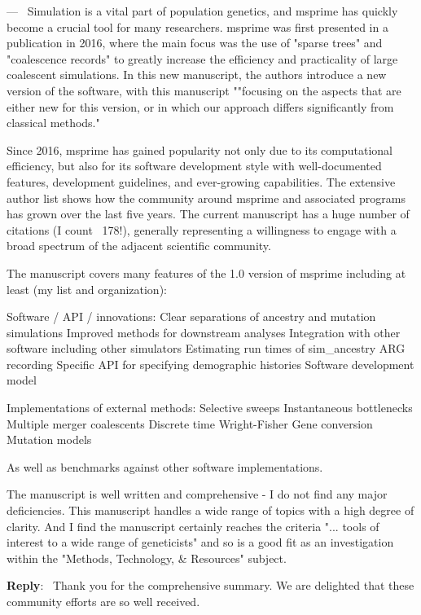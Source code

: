 \documentclass[11pt]{article}
\newcounter{reviewer}
\newcounter{point}[reviewer]
\renewcommand{\thepoint}{\thereviewer.\arabic{point}}
\newenvironment{point}
   {\refstepcounter{point} \bigskip \noindent {\textbf{Reviewer~Point~\thepoint} } ---\ }
   {\par }
\newenvironment{reply}
   {\medskip \noindent \begin{sf}\textbf{Reply}:\  }
   {\medskip \end{sf}}
\begin{document}
\begin{point}
Simulation is a vital part of population genetics, and msprime has quickly
become a crucial tool for many researchers. msprime was first presented in a
publication in 2016, where the main focus was the use of "sparse trees" and
"coalescence records" to greatly increase the efficiency and practicality of
large coalescent simulations. In this new manuscript, the authors introduce a
new version of the software, with this manuscript ""focusing on the aspects
that are either new for this version, or in which our approach differs
significantly from classical methods."

Since 2016, msprime has gained popularity not only due to its computational
efficiency, but also for its software development style with well-documented
features, development guidelines, and ever-growing capabilities. The extensive
author list shows how the community around msprime and associated programs has
grown over the last five years. The current manuscript has a huge number of
citations (I count ~178!), generally representing a willingness to engage with
a broad spectrum of the adjacent scientific community.

The manuscript covers many features of the 1.0 version of msprime including at
least (my list and organization):

Software / API / innovations:
Clear separations of ancestry and mutation simulations
Improved methods for downstream analyses
Integration with other software including other simulators
Estimating run times of sim\_ancestry
ARG recording
Specific API for specifying demographic histories
Software development model

Implementations of external methods:
Selective sweeps
Instantaneous bottlenecks
Multiple merger coalescents
Discrete time Wright-Fisher
Gene conversion
Mutation models

As well as benchmarks against other software implementations.

The manuscript is well written and comprehensive - I do not find any major
deficiencies. This manuscript handles a wide range of topics with a high degree
of clarity. And I find the manuscript certainly reaches the criteria "... tools
of interest to a wide range of geneticists" and so is a good fit as an
investigation within the "Methods, Technology, \& Resources" subject.
\end{point}

\begin{reply}
Thank you for the comprehensive summary. We are delighted that these community
efforts are so well received.
\end{reply}
\end{document}
